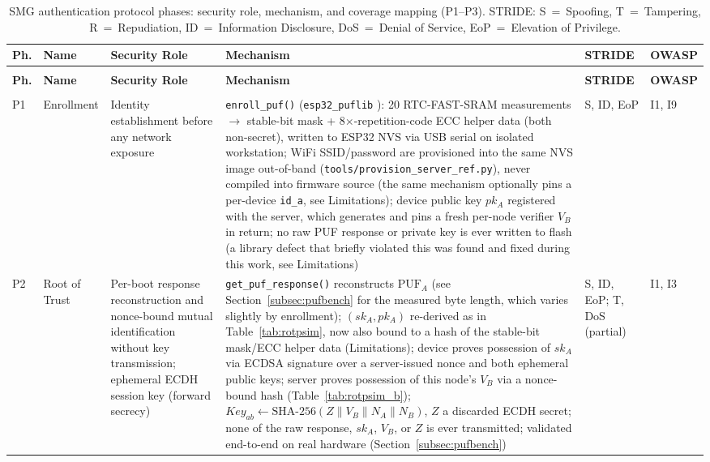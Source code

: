 \documentclass[preprint,12pt,authoryear]{elsarticle}
\begin{document}
\begingroup
\footnotesize
\renewcommand{\arraystretch}{1.0}
\begin{longtable}{
    >{\centering\arraybackslash}p{0.4cm}
    >{\raggedright\arraybackslash}p{1.8cm}
    >{\raggedright\arraybackslash}p{1.8cm}
    >{\raggedright\arraybackslash}p{4.2cm}
    >{\centering\arraybackslash}p{1.5cm}
    >{\centering\arraybackslash}p{1.4cm}
}
    \caption{SMG authentication protocol phases: security role, mechanism, and coverage mapping (P1--P3). STRIDE: S~=~Spoofing, T~=~Tampering, R~=~Repudiation, ID~=~Information Disclosure, DoS~=~Denial of Service, EoP~=~Elevation of Privilege.}
    \label{tab:phases_a} \\
    \toprule
    \textbf{Ph.} & \textbf{Name} & \textbf{Security Role} & \textbf{Mechanism} & \textbf{STRIDE} & \textbf{OWASP} \\
    \midrule
    \endfirsthead
    \multicolumn{6}{l}{\small\textit{Table~\ref{tab:phases_a} continued from previous page}} \\
    \toprule
    \textbf{Ph.} & \textbf{Name} & \textbf{Security Role} & \textbf{Mechanism} & \textbf{STRIDE} & \textbf{OWASP} \\
    \midrule
    \endhead
    \midrule
    \multicolumn{6}{r}{\small\textit{continued on next page}} \\
    \endfoot
    \bottomrule
    \endlastfoot
        P1 & Enrollment & Identity establishment before any network exposure & \texttt{enroll\_puf()} (\texttt{esp32\_puflib} \citep{stanicek2022esp32puflib}): 20 RTC-FAST-SRAM measurements $\rightarrow$ stable-bit mask + 8$\times$-repetition-code ECC helper data (both non-secret), written to ESP32 NVS via USB serial on isolated workstation; WiFi SSID/password are provisioned into the same NVS image out-of-band (\texttt{tools/\allowbreak provision\_server\_ref.py}), never compiled into firmware source (the same mechanism optionally pins a per-device \texttt{id\_a}, see Limitations); device public key $pk_A$ registered with the server, which generates and pins a fresh per-node verifier $V_B$ in return; no raw PUF response or private key is ever written to flash (a library defect that briefly violated this was found and fixed during this work, see Limitations) & S, ID, EoP & I1, I9 \\
        \midrule
        P2 & Root of Trust & Per-boot response reconstruction and nonce-bound mutual identification without key transmission; ephemeral ECDH session key (forward secrecy) & \texttt{get\_puf\_response()} reconstructs $\text{PUF}_A$ (see Section~\ref{subsec:pufbench} for the measured byte length, which varies slightly by enrollment); $(sk_A, pk_A)$ re-derived as in Table~\ref{tab:rotpsim}, now also bound to a hash of the stable-bit mask/ECC helper data (Limitations); device proves possession of $sk_A$ via ECDSA signature over a server-issued nonce and both ephemeral public keys; server proves possession of this node's $V_B$ via a nonce-bound hash (Table~\ref{tab:rotpsim_b}); $Key_{ab} \leftarrow \text{SHA-256}(Z \!\parallel\! V_B \!\parallel\! N_A \!\parallel\! N_B)$, $Z$ a discarded ECDH secret; none of the raw response, $sk_A$, $V_B$, or $Z$ is ever transmitted; validated end-to-end on real hardware (Section~\ref{subsec:pufbench}) & S, ID, EoP; T, DoS (partial) & I1, I3 \\

\end{longtable}
\end{document}
